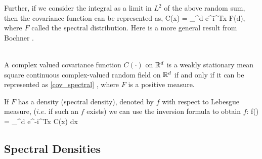 Further, if we consider the integral as a limit in $L^2$ of the above random sum, then the covariance function can be represented as,
\beq \label{cov_spectral}
C(x) = \int_{^d} e^{i\omega^Tx} F(d\omega),
\eeq
where $F$ called the spectral distribution. Here is a more general result from Bochner \citep{Stein1999}.

\begin{theorem}\hfill \\
A complex valued covariance function $C(\cdot)$ on $\mathbb{R}^d$ is a weakly stationary mean square continuous complex-valued random field on $\mathbb{R}^d$ if and only if it can be represented as \eqref{cov_spectral} , where $F$ is a positive measure.
\end{theorem}
If $F$ has a density (spectral density), denoted by $f$ with respect to Lebesgue measure, ($i.e.$ if such an $f$ exists) we can use the inversion formula to obtain $f$:
\beq
f(\omega) =   \int_{\R^d} e^{-i\omega^Tx} C(x) dx
\eeq


\subsection{Spectral Densities}

